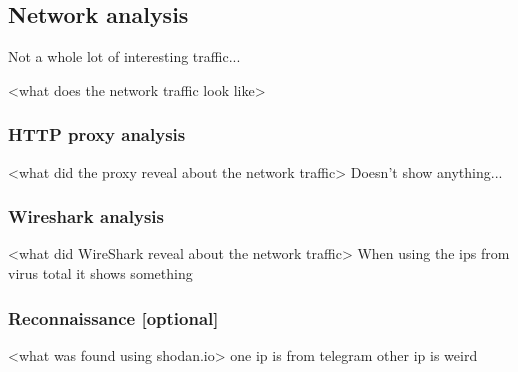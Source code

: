 \subsection{Network analysis}

Not a whole lot of interesting traffic...

<what does the network traffic look like>

\subsubsection{HTTP proxy analysis}

<what did the proxy reveal about the network traffic>
Doesn't show anything...

\subsubsection{Wireshark analysis}

<what did WireShark reveal about the network traffic>
When using the ips from virus total it shows something

\subsubsection{Reconnaissance [optional]}

<what was found using shodan.io>
one ip is from telegram
other ip is weird